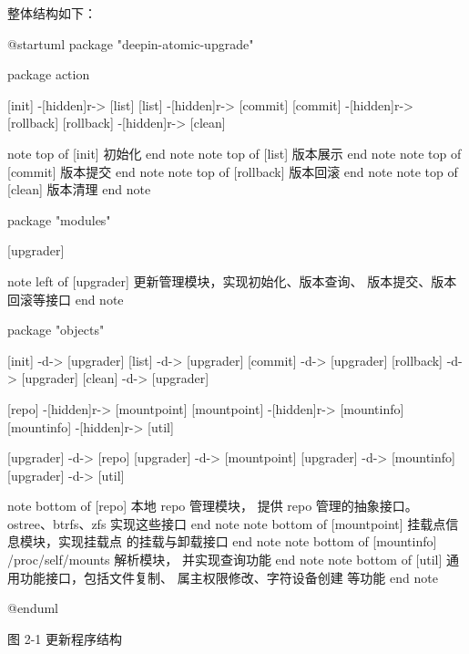 \documentclass{utart}
\begin{document}
整体结构如下：
\begin{center}
  \begin{adjustbox}{scale=0.75}
    \begin{plantuml}
      @startuml
      package "deepin-atomic-upgrade" {
        package action {
          [init] -[hidden]r-> [list]
          [list] -[hidden]r-> [commit]
          [commit] -[hidden]r-> [rollback]
          [rollback] -[hidden]r-> [clean]

          note top of [init]
          初始化
          end note
          note top of [list]
          版本展示
          end note
          note top of [commit]
          版本提交
          end note
          note top of [rollback]
          版本回滚
          end note
          note top of [clean]
          版本清理
          end note
        }

        package "modules" {
          [upgrader]

          note left of [upgrader]
          更新管理模块，实现初始化、版本查询、
          版本提交、版本回滚等接口
          end note
        }

        package "objects" {
          [init] -d-> [upgrader]
          [list] -d-> [upgrader]
          [commit] -d-> [upgrader]
          [rollback] -d-> [upgrader]
          [clean] -d-> [upgrader]

          [repo] -[hidden]r-> [mountpoint]
          [mountpoint] -[hidden]r-> [mountinfo]
          [mountinfo] -[hidden]r-> [util]

          [upgrader] -d-> [repo]
          [upgrader] -d-> [mountpoint]
          [upgrader] -d-> [mountinfo]
          [upgrader] -d-> [util]

          note bottom of [repo]
          本地 repo 管理模块，
          提供 repo 管理的抽象接口。
          ostree、btrfs、zfs 实现这些接口
          end note
          note bottom of [mountpoint]
          挂载点信息模块，实现挂载点
          的挂载与卸载接口
          end note
          note bottom of [mountinfo]
          /proc/self/mounts 解析模块，
          并实现查询功能
          end note
          note bottom of [util]
          通用功能接口，包括文件复制、
          属主权限修改、字符设备创建
          等功能
          end note
        }
      }
      @enduml
    \end{plantuml}
  \end{adjustbox}

  图 2-1 更新程序结构
\end{center}
\end{document}
